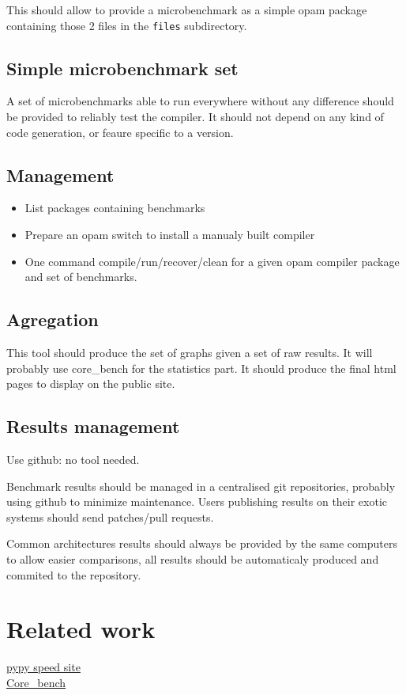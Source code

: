 \documentclass[11pt,a4paper]{article}
\begin{document}
This should allow to provide a microbenchmark as a simple opam package
containing those 2 files in the \texttt{files} subdirectory.

\subsection{Simple microbenchmark set}

A set of microbenchmarks able to run everywhere without any difference
should be provided to reliably test the compiler. It should not depend
on any kind of code generation, or feaure specific to a version.

\subsection{Management}

\begin{itemize}
\item List packages containing benchmarks
\item Prepare an opam switch to install a manualy built compiler
\item One command compile/run/recover/clean for a given opam compiler
  package and set of benchmarks.
\end{itemize}

\subsection{Agregation}

This tool should produce the set of graphs given a set of raw
results. It will probably use core\_bench for the statistics part. It
should produce the final html pages to display on the public site.

\subsection{Results management}

Use github: no tool needed.

Benchmark results should be managed in a centralised git repositories,
probably using github to minimize maintenance. Users publishing
results on their exotic systems should send patches/pull requests.

Common architectures results should always be provided by the same
computers to allow easier comparisons, all results should be
automaticaly produced and commited to the repository.

\section{Related work}

\href{http://speed.pypy.org/}{pypy speed site}\\
\href{https://github.com/janestreet/core_bench}{Core\_bench}
\end{document}
